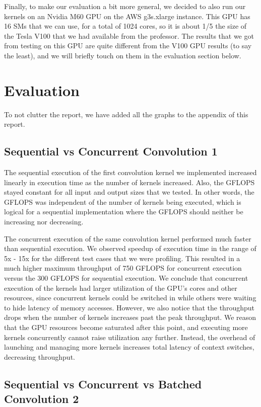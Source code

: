 \documentclass[sigconf]{acmart}
\begin{document}
Finally, to make our evaluation a bit more general, we decided to also run our kernels on an Nvidia M60 GPU on the AWS g3s.xlarge instance. This GPU has 16 SMs that we can use, for a total of 1024 cores, so it is about 1/5 the size of the Tesla V100 that we had available from the professor. The results that we got from testing on this GPU are quite different from the V100 GPU results (to say the least), and we will briefly touch on them in the evaluation section below. 

\section{Evaluation}
To not clutter the report, we have added all the graphs to the appendix of this report.

\subsection{Sequential vs Concurrent Convolution 1}
The sequential execution of the first convolution kernel we implemented increased linearly in execution time as the number of kernels increased. Also, the GFLOPS stayed constant for all input and output sizes that we tested. In other words, the GFLOPS was independent of the number of kernels being executed, which is logical for a sequential implementation where the GFLOPS should neither be increasing nor decreasing. 

The concurrent execution of the same convolution kernel performed much faster than sequential execution. We observed speedup of execution time in the range of 5x - 15x for the different test cases that we were profiling. This resulted in a much higher maximum throughput of 750 GFLOPS for concurrent execution versus the 300 GFLOPS for sequential execution. We conclude that concurrent execution of the kernels had larger utilization of the GPU’s cores and other resources, since concurrent kernels could be switched in while others were waiting to hide latency of memory accesses. However, we also notice that the throughput drops when the number of kernels increases past the peak throughput. We reason that the GPU resources become saturated after this point, and executing more kernels concurrently cannot raise utilization any further. Instead, the overhead of launching and managing more kernels increases total latency of context switches, decreasing throughput.


\subsection{Sequential vs Concurrent vs Batched Convolution 2}
\end{document}
